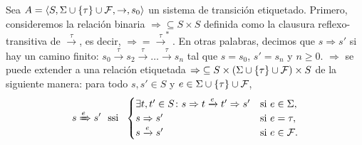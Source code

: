 Sea $A =\langle S, \Sigma \cup \{\tau\} \cup \mathcal{F},  \rightarrow, s_0\rangle$ un sistema de transición etiquetado. Primero, consideremos la relación binaria ${\Rightarrow} \subseteq S \times S$ definida como la clausura reflexo-transitiva de $\xrightarrow{\tau}$, es decir, ${\Rightarrow} = {\xrightarrow{\tau}^*}$.  En otras palabras, decimos que $s \Rightarrow s'$ si hay un camino finito:  $s_0 \xrightarrow{\tau} s_2 \xrightarrow{\tau} \dots \xrightarrow{\tau} s_n$ tal que $s = s_0$, $s' = s_n$ y $n \geq 0$.
$\Rightarrow$ se puede extender a una relación etiquetada ${\Rightarrow} \subseteq S\times (\Sigma \cup \{\tau\} \cup \mathcal{F}) \times S$ de la siguiente manera: para todo $s,s'\in S$ y $e\in {\Sigma \cup \{\tau\} \cup \mathcal{F}}$,
 \[
s \xRightarrow{e} s' \text{ \ ssi \ }
        \begin{cases}
            \exists t,t'\in S \colon s \Rightarrow t \xrightarrow{e} t' \Rightarrow s' & 
             \text{si } e \in \Sigma,  \\ 
            s \Rightarrow s' & \text{si } e = \tau,  \\
            s \xrightarrow{e} s' & \text{si } e \in \mathcal{F}.\\
        \end{cases}
 \]
 


%

